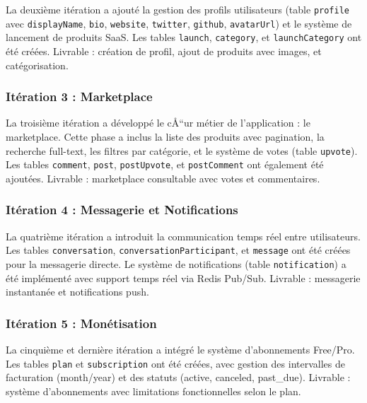 La deuxième itération a ajouté la gestion des profils utilisateurs (table \texttt{profile} avec \texttt{displayName}, \texttt{bio}, \texttt{website}, \texttt{twitter}, \texttt{github}, \texttt{avatarUrl}) et le système de lancement de produits SaaS. Les tables \texttt{launch}, \texttt{category}, et \texttt{launchCategory} ont été créées. Livrable : création de profil, ajout de produits avec images, et catégorisation.



\subsubsection{Itération 3 : Marketplace}



La troisième itération a développé le cÅ“ur métier de l'application : le marketplace. Cette phase a inclus la liste des produits avec pagination, la recherche full-text, les filtres par catégorie, et le système de votes (table \texttt{upvote}). Les tables \texttt{comment}, \texttt{post}, \texttt{postUpvote}, et \texttt{postComment} ont également été ajoutées. Livrable : marketplace consultable avec votes et commentaires.



\subsubsection{Itération 4 : Messagerie et Notifications}



La quatrième itération a introduit la communication temps réel entre utilisateurs. Les tables \texttt{conversation}, \texttt{conversationParticipant}, et \texttt{message} ont été créées pour la messagerie directe. Le système de notifications (table \texttt{notification}) a été implémenté avec support temps réel via Redis Pub/Sub. Livrable : messagerie instantanée et notifications push.



\subsubsection{Itération 5 : Monétisation}



La cinquième et dernière itération a intégré le système d'abonnements Free/Pro. Les tables \texttt{plan} et \texttt{subscription} ont été créées, avec gestion des intervalles de facturation (month/year) et des statuts (active, canceled, past\_due). Livrable : système d'abonnements avec limitations fonctionnelles selon le plan.


